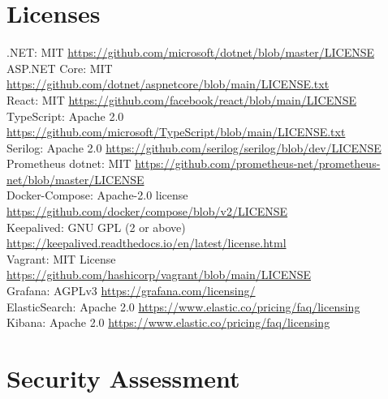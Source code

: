 \appendix
\section{Licenses} \label{ssec:licences}
.NET: MIT \url{https://github.com/microsoft/dotnet/blob/master/LICENSE} \\
ASP.NET Core: MIT \url{https://github.com/dotnet/aspnetcore/blob/main/LICENSE.txt} \\
React: MIT \url{https://github.com/facebook/react/blob/main/LICENSE} \\
TypeScript: Apache 2.0 \url{https://github.com/microsoft/TypeScript/blob/main/LICENSE.txt} \\
Serilog: Apache 2.0 \url{https://github.com/serilog/serilog/blob/dev/LICENSE} \\
Prometheus dotnet: MIT \url{https://github.com/prometheus-net/prometheus-net/blob/master/LICENSE} \\
Docker-Compose: Apache-2.0 license \url{https://github.com/docker/compose/blob/v2/LICENSE} \\
Keepalived: GNU GPL (2 or above) \url{https://keepalived.readthedocs.io/en/latest/license.html} \\
Vagrant: MIT License \url{https://github.com/hashicorp/vagrant/blob/main/LICENSE} \\
Grafana: AGPLv3 \url{https://grafana.com/licensing/} \\
ElasticSearch: Apache 2.0 \url{https://www.elastic.co/pricing/faq/licensing} \\
Kibana: Apache 2.0 \url{https://www.elastic.co/pricing/faq/licensing} \\

\section{Security Assessment}\label{app:security_assessment}


